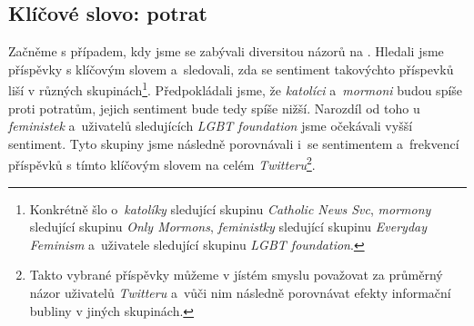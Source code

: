 \documentclass[12pt, a4paper]{article}
\numberwithin{equation}{section} 	%
\begin{document}
\subsection{Klíčové slovo: potrat}\label{subsec:abortion}
\noindent Začněme s případem, kdy jsme se zabývali diversitou názorů na \textit{}. Hledali jsme příspěvky s klíčovým slovem \textit{} a~sledovali, zda se sentiment takovýchto příspevků liší v různých skupinách\footnote{Konkrétně šlo o~\textit{katolíky} sledující skupinu \textit{Catholic News Svc}, \textit{mormony} sledující skupinu \textit{Only Mormons}, \textit{feministky} sledující skupinu \textit{Everyday Feminism} a~uživatele sledující skupinu \textit{LGBT foundation}.}. Předpokládali jsme, že \textit{katolíci} a~\textit{mormoni} budou spíše proti potratům, jejich sentiment bude tedy spíše nižší. Narozdíl od toho u \textit{feministek} a~uživatelů sledujících \textit{LGBT foundation} jsme očekávali vyšší sentiment. Tyto skupiny jsme následně porovnávali i~se sentimentem a~frekvencí příspěvků s tímto klíčovým slovem na celém \textit{Twitteru}\footnote{Takto vybrané příspěvky můžeme v jístém smyslu považovat za průměrný názor uživatelů \textit{Twitteru} a~vůči nim následně porovnávat efekty informační bubliny v jiných skupinách.}.
\end{document}
